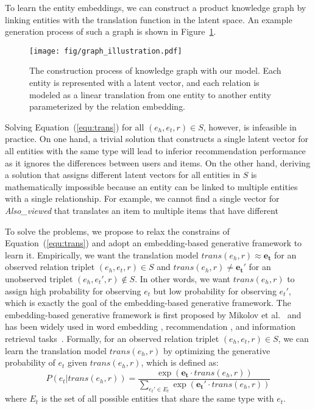 \documentclass[algorithms,article,accept,moreauthors,pdftex,10pt,a4paper]{Definitions/mdpi}
\begin{document}
To learn the entity embeddings, we can construct a product knowledge graph by linking entities with the translation function in the latent space.
An example generation process of such a graph is shown in Figure~\ref{fig:illustration}.
\begin{figure}[H]
	\centering
	\vspace{-5pt}
	\texttt{[image: fig/graph\_illustration.pdf]}
	\caption{The construction process of knowledge graph with our model. Each entity is represented with a latent vector, and each relation is modeled as a linear translation from one entity to another entity parameterized by the relation embedding.}\vspace{-5pt}
	\label{fig:illustration}
\end{figure}

Solving Equation~(\ref{equ:trans}) for all $(e_h, e_t, r) \in S$, however, is infeasible in practice.
On one hand, a trivial solution that constructs a single latent vector for all entities with the same type will lead to inferior recommendation performance as it ignores the differences between users and items.
On the other hand, deriving a solution that assigns different latent vectors for all entities in $S$ is mathematically impossible because an entity can be linked to multiple entities with a single relationship.
For example, we cannot find a single vector for \textit{Also\_viewed} that translates an item to multiple items that have different 

To solve the problems, we propose to relax the constrains of Equation~(\ref{equ:trans}) and adopt an embedding-based generative framework to learn it.
Empirically, we want the translation model $trans(e_h, r) \approx \bm{e_t}$ for an observed relation triplet $(e_h, e_t, r) \in S$ and $trans(e_h, r) \neq \bm{e_t'}$ for an unobserved triplet $(e_h, e_t', r) \notin S$.
In other words, we want $trans(e_h, r)$ to assign high probability for observing $e_t$ but low probability for observing $e_t'$, which is exactly the goal of the embedding-based generative framework. 
The embedding-based generative framework is first proposed by Mikolov et al.~\cite{mikolov2013distributed} and has been widely used in word embedding \cite{mikolov2013distributed,le2014distributed}, recommendation \cite{zhang2017joint,zheng2017joint}, and information retrieval tasks~\cite{ai2016analysis, ai2017learning}.
Formally, for an observed relation triplet $(e_h, e_t, r) \in S$, we can learn the translation model $trans(e_h, r)$ by optimizing the generative probability of $e_t$ given $trans(e_h, r)$, which is defined as:
\begin{equation}
P(e_t | trans(e_h, r)) = \frac{\exp(\bm{e_t} \cdot trans(e_h, r))}{\sum_{e_t' \in E_t}\exp(\bm{e_t'} \cdot trans(e_h, r))}
\label{equ:softmax}
\end{equation}
where $E_t$ is the set of all possible entities that share the same type with $e_t$.
\end{document}
